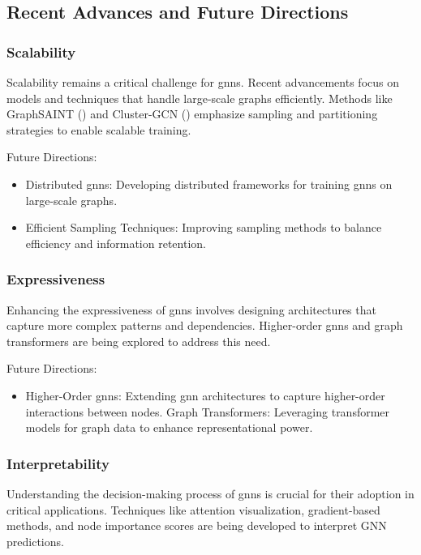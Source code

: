 \subsection*{Recent Advances and Future Directions}

\subsubsection*{Scalability}

Scalability remains a critical challenge for \glspl{gnn}. Recent advancements focus on models and techniques that handle large-scale graphs efficiently. Methods like GraphSAINT (\cite{Zeng2019}) and Cluster-GCN (\cite{Chiang2019}) emphasize sampling and partitioning strategies to enable scalable training.

Future Directions:
\begin{itemize}
    \item Distributed \glspl{gnn}: Developing distributed frameworks for training \glspl{gnn} on large-scale graphs.
    \item Efficient Sampling Techniques: Improving sampling methods to balance efficiency and information retention.
\end{itemize}


\subsubsection*{Expressiveness}

Enhancing the expressiveness of \glspl{gnn} involves designing architectures that capture more complex patterns and dependencies. Higher-order \glspl{gnn} and graph transformers are being explored to address this need.

Future Directions:
\begin{itemize}
    \item Higher-Order \glspl{gnn}: Extending \gls{gnn} architectures to capture higher-order interactions between nodes.
    Graph Transformers: Leveraging transformer models for graph data to enhance representational power.
\end{itemize}

\subsubsection*{Interpretability}

Understanding the decision-making process of \glspl{gnn} is crucial for their adoption in critical applications. Techniques like attention visualization, gradient-based methods, and node importance scores are being developed to interpret GNN predictions.

